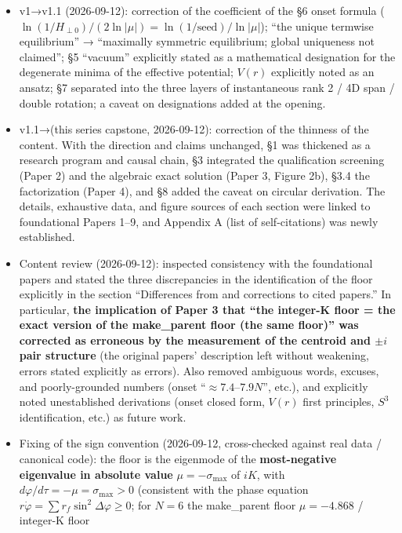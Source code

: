 \documentclass[
  a4paper,
]{ltjsarticle}
\providecommand{\tightlist}{%
  \setlength{\itemsep}{0pt}\setlength{\parskip}{0pt}}
\begin{document}
\begin{itemize}
\tightlist
\item
  v1→v1.1 (2026-09-12): correction of the coefficient of the §6 onset
  formula
  (\(\ln(1/H_{\perp0})/(2\ln|\mu|)=\ln(1/\text{seed})/\ln|\mu|\)); ``the
  unique termwise equilibrium'' → ``maximally symmetric equilibrium;
  global uniqueness not claimed''; §5 ``vacuum'' explicitly stated as a
  mathematical designation for the degenerate minima of the effective
  potential; \(V(r)\) explicitly noted as an ansatz; §7 separated into
  the three layers of instantaneous rank 2 / 4D span / double rotation;
  a caveat on designations added at the opening.
\item
  v1.1→(this series capstone, 2026-09-12): correction of the thinness of
  the content. With the direction and claims unchanged, §1 was thickened
  as a research program and causal chain, §3 integrated the
  qualification screening (Paper 2) and the algebraic exact solution
  (Paper 3, Figure 2b), §3.4 the factorization (Paper 4), and §8 added
  the caveat on circular derivation. The details, exhaustive data, and
  figure sources of each section were linked to foundational Papers
  1--9, and Appendix A (list of self-citations) was newly established.
\item
  Content review (2026-09-12): inspected consistency with the
  foundational papers and stated the three discrepancies in the
  identification of the floor explicitly in the section ``Differences
  from and corrections to cited papers.'' In particular, \textbf{the
  implication of Paper 3 that ``the integer-K floor = the exact version
  of the make\_parent floor (the same floor)'' was corrected as
  erroneous by the measurement of the centroid and \(\pm i\) pair
  structure} (the original papers' description left without weakening,
  errors stated explicitly as errors). Also removed ambiguous words,
  excuses, and poorly-grounded numbers (onset
  ``\(\approx7.4\)--\(7.9N\)'', etc.), and explicitly noted
  unestablished derivations (onset closed form, \(V(r)\) first
  principles, \(S^3\) identification, etc.) as future work.
\item
  Fixing of the sign convention (2026-09-12, cross-checked against real
  data / canonical code): the floor is the eigenmode of the
  \textbf{most-negative eigenvalue in absolute value}
  \(\mu=-\sigma_{\max}\) of \(iK\), with
  \(d\varphi/d\tau=-\mu=\sigma_{\max}>0\) (consistent with the phase
  equation \(r\dot\varphi=\sum r_f\sin^2\Delta\varphi\ge0\); for \(N=6\)
  the make\_parent floor \(\mu=-4.868\) / integer-K floor

\end{itemize}
\end{document}
